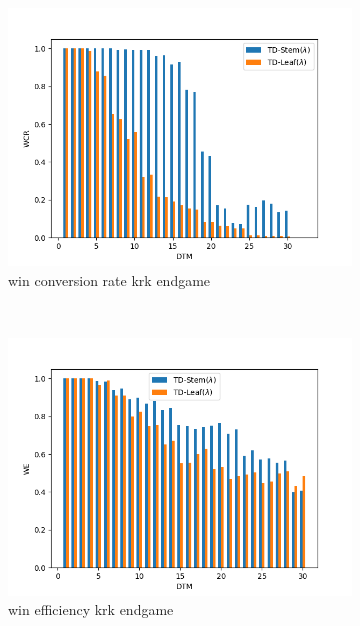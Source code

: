 \begin{figure}
\centering
\begin{subfigure}[b]{0.4\textwidth}
\centering
\includegraphics[scale=0.5]{fig/plots/krk_wcr}
\caption{win conversion rate \gls{krk} endgame}
\end{subfigure}
\\
\begin{subfigure}[b]{0.4\textwidth}
\centering
\includegraphics[scale=0.5]{fig/plots/krk_we}
\caption{win efficiency \gls{krk} endgame}
\end{subfigure}
\qquad
\begin{subfigure}[b]{0.4\textwidth}
\centering

\end{subfigure}
\end{figure}
